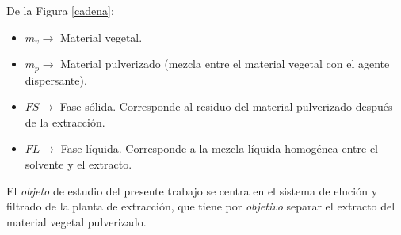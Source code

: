 \newpage

\noindent
\justify

De la Figura \ref{cadena}:

\begin{itemize}
	\item $m_v \rightarrow $ Material vegetal.
	\item $m_p \rightarrow $ Material pulverizado (mezcla entre el material vegetal con el agente dispersante).
	\item $FS \rightarrow $ Fase s\'olida. Corresponde al residuo del material pulverizado despu\'es de la extracci\'on.
	\item $FL \rightarrow $ Fase l\'iquida. Corresponde a la mezcla l\'iquida homog\'enea entre el solvente y el extracto.
\end{itemize}

\noindent
\justify

El \textit{objeto} de estudio del presente trabajo se centra en el sistema de eluci\'on y filtrado de la planta de extracci\'on, que tiene por \textit{objetivo} separar el extracto del material vegetal pulverizado.

